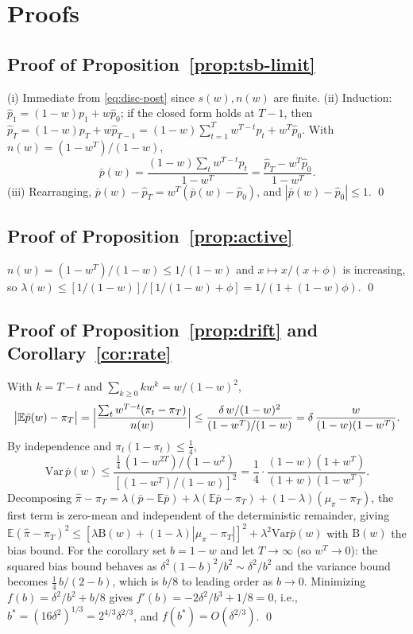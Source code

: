 \documentclass[twocolumn,10pt]{article}
\newcommand{\E}{\mathbb{E}}
\newcommand{\Var}{\mathrm{Var}}
\begin{document}
\section{Proofs}\label{app:proofs}

\subsection{Proof of Proposition~\ref{prop:tsb-limit}}
(i) Immediate from \eqref{eq:disc-post} since $s(w),n(w)$ are finite.
(ii) Induction: $\hat p_1=(1-w)p_1+w\hat p_0$; if the closed form holds at
$T-1$, then
$\hat p_T=(1-w)p_T+w\hat p_{T-1}=(1-w)\sum_{t=1}^{T}w^{T-t}p_t+w^{T}\hat p_0$.
With $n(w)=(1-w^{T})/(1-w)$,
\[
\bar p(w)=\frac{(1-w)\sum_t w^{T-t}p_t}{1-w^{T}}
=\frac{\hat p_T-w^{T}\hat p_0}{1-w^{T}}.
\]
(iii) Rearranging, $\bar p(w)-\hat p_T=w^{T}(\bar p(w)-\hat p_0)$, and
$|\bar p(w)-\hat p_0|\le1$. \qed

\subsection{Proof of Proposition~\ref{prop:active}}
$n(w)=(1-w^{T})/(1-w)\le1/(1-w)$ and $x\mapsto x/(x+\phi)$ is increasing,
so $\lambda(w)\le[1/(1-w)]/[1/(1-w)+\phi]=1/(1+(1-w)\phi)$. \qed

\subsection{Proof of Proposition~\ref{prop:drift} and
Corollary~\ref{cor:rate}}
With $k=T-t$ and $\sum_{k\ge0}kw^k=w/(1-w)^2$,
\[
\bigl|\E\bar p(w)-\pi_T\bigr|
=\Bigl|\frac{\sum_t w^{T-t}(\pi_t-\pi_T)}{n(w)}\Bigr|
\le\frac{\delta\,w/(1-w)^2}{(1-w^{T})/(1-w)}
=\delta\,\frac{w}{(1-w)(1-w^{T})}.
\]
By independence and $\pi_t(1-\pi_t)\le\tfrac14$,
\[
\Var\,\bar p(w)\le\frac{\tfrac14\,(1-w^{2T})/(1-w^{2})}
{[(1-w^{T})/(1-w)]^{2}}
=\frac14\cdot\frac{(1-w)(1+w^{T})}{(1+w)(1-w^{T})}.
\]
Decomposing
$\hat\pi-\pi_T=\lambda(\bar p-\E\bar p)+\lambda(\E\bar p-\pi_T)+(1-\lambda)(\mu_\pi-\pi_T)$,
the first term is zero-mean and independent of the deterministic
remainder, giving
$\E(\hat\pi-\pi_T)^2\le[\lambda\mathrm{B}(w)+(1-\lambda)|\mu_\pi-\pi_T|]^2
+\lambda^2\Var\bar p(w)$ with $\mathrm{B}(w)$ the bias bound. For the
corollary set $b=1-w$ and let $T\to\infty$ (so $w^{T}\to0$): the squared
bias bound behaves as $\delta^2(1-b)^2/b^2\sim\delta^2/b^2$ and the
variance bound becomes $\tfrac14\, b/(2-b)$, which is $b/8$ to leading
order as $b\to0$. Minimizing $f(b)=\delta^2/b^2+b/8$ gives
$f'(b)=-2\delta^2/b^3+1/8=0$, i.e.,
$b^{*}=(16\delta^{2})^{1/3}=2^{4/3}\delta^{2/3}$, and
$f(b^{*})=O(\delta^{2/3})$. \qed
\end{document}
